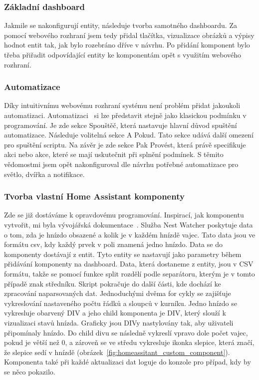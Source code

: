 \subsubsection*{Základní dashboard}
Jakmile se nakonfigurují entity, následuje tvorba samotného dashboardu.
Za pomocí webového rozhraní jsem tedy přidal tlačítka, vizualizace obrázků a výpisy hodnot entit tak, jak bylo rozebráno dříve v návrhu.
Po přidání komponent bylo třeba přiřadit odpovídající entity ke komponentám opět s využitím webového rozhraní.

\subsubsection*{Automatizace}
Díky intuitivnímu webovému rozhraní systému není problém přidat jakoukoli automatizaci.
Automatizaci~\cite{HomeAssistantAutomations} si lze představit stejně jako klasickou podmínku v programování.
Je zde sekce Spouštěč, která nastavuje hlavní důvod spuštění automatizace.
Následuje volitelná sekce A Pokud.
Tato sekce udává další omezení pro spuštění scriptu.
Na závěr je zde sekce Pak Provést, která právě specifikuje akci nebo akce, které se mají uskutečnit při splnění podmínek.
S těmito vědomostmi jsem opět nakonfiguroval dle návrhu potřebné automatizace pro světlo, dvířka a notifikace.

\subsubsection*{Tvorba vlastní Home Assistant komponenty}
Zde se již dostáváme k opravdovému programování.
Inspirací, jak komponentu vytvořit, mi byla vývojářská dokumentace~\cite{HomeAssistantCustomCards}.
Služba Nest Watcher poskytuje data o tom, zda je hnízdo obsazené a kolik je v každém hnízdě vajec.
Tato data jsou ve formátu \gls{csv}, kdy každý prvek v poli znamená jedno hnízdo.
Data se do komponenty dostávají z entit.
Tyto entity se nastavují jako parametry během přidávání komponenty na dashboard.
Data, která dostaneme z entity, jsou v CSV formátu, takže se pomocí funkce split rozdělí podle separátoru, kterým je v tomto případě znak středníku.
Skript pokračuje do další části, kde dochází ke zpracování naparsovaných dat.
Jednoduchými dvěma for cykly se zajišťuje vykreslování nastaveného počtu řádků a sloupců v kurníku.
Jedno hnízdo se vykresluje obarvený DIV a jeho child komponenta je DIV, který slouží k vizualizaci stavů hnízda.
Graficky jsou DIVy nastylovány tak, aby uživateli připomínaly hnízdo.
Do child divu se následně vykreslí vpravo dole počet vajec, pokud je větší než 0, a zároveň se ve středu vykresluje ikonka slepice, která značí, že slepice sedí v hnízdě (obrázek~\ref{fig:homeassitant_custom_component}).
Komponenta také při každé aktualizaci dat loguje do konzole pro případ, kdy by se něco pokazilo.


